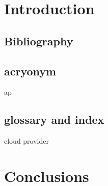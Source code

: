 \documentclass[11pt,letterpaper]{ryersonSGSThesis}
\begin{document}
\begin{ryersonSGSThesis}
\chapter{Introduction}
\label{chap:Introduction}
\lipsum


\section{Bibliography}
\cite{2018_TwitterQuarterlyResults}

\section{acryonym}
\gls{ap}

\section{glossary and index}
\gls{cloud provider}

\chapter{Conclusions}
\label{chap:conclusions}
\lipsum

\end{ryersonSGSThesis}
\appendix
\appendixpage       
\addappheadtotoc

\clearpage
{}


\clearpage
\printglossary[type=\acronymtype]
\printglossary[type=main]

\clearpage
{}
\printindex
\end{document}
